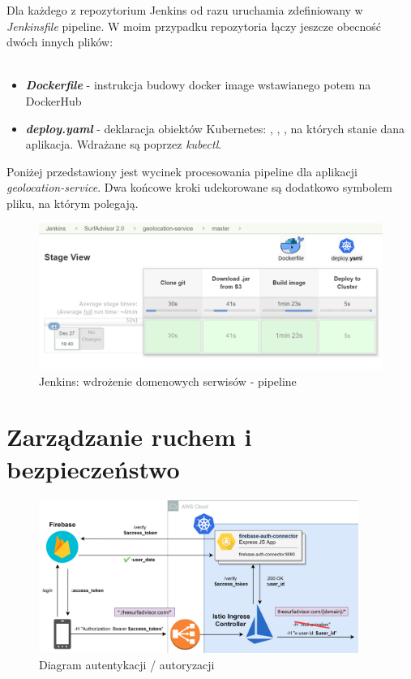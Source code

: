 Dla każdego z repozytorium Jenkins od razu uruchamia zdefiniowany w \emph{Jenkinsfile} pipeline.
W moim przypadku repozytoria łączy jeszcze obecność dwóch innych plików:
\\\\
\begin{itemize}
    \item
    \emph{\textbf{Dockerfile}} - instrukcja budowy docker image wstawianego potem na DockerHub
    \item
    \emph{\textbf{deploy.yaml}} - deklaracja obiektów Kubernetes: , , , na których stanie dana aplikacja.
    Wdrażane są poprzez \emph{kubectl}.
\end{itemize} 

Poniżej przedstawiony jest wycinek procesowania pipeline dla aplikacji \emph{geolocation-service}.
Dwa końcowe kroki udekorowane są dodatkowo symbolem pliku, na którym polegają.

\begin{figure}[!ht]
	\begin{center}
		\includegraphics[width=1\textwidth]{img/jenkins-geo-stages}
	\end{center}
	\caption{Jenkins: wdrożenie domenowych serwisów - pipeline}
\end{figure}




\section{Zarządzanie ruchem i bezpieczeństwo}
\label{traffic}

\begin{figure}[!ht]
    
	\begin{center}
		\includegraphics[width=0.93\textwidth]{img/security-flow}
	\end{center}
    \caption{Diagram autentykacji / autoryzacji}
    \label{security-diagram}
\end{figure}


